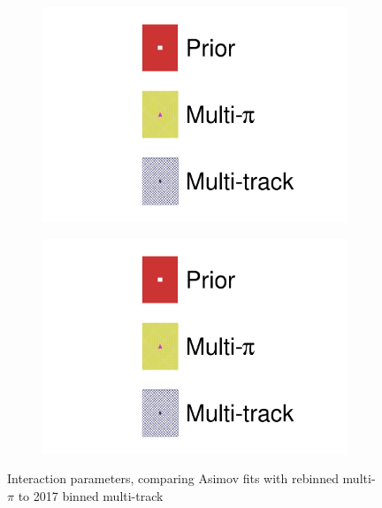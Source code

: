 \begin{figure}[h]
	\begin{subfigure}[t]{0.49\textwidth}
		\includegraphics[width=\textwidth,page=20, trim={0mm 0mm 0mm 9mm}, clip]{figures/mach3/2018/asimov/2018a_FixedCov_RedCov_Mpi_Asimov_merg_2018a_NewDetMatrix_OrderSwitched_Data2to8_merge}
	\end{subfigure}
	\begin{subfigure}[t]{0.49\textwidth}
		\includegraphics[width=\textwidth,page=21, trim={0mm 0mm 0mm 9mm}, clip]{figures/mach3/2018/asimov/2018a_FixedCov_RedCov_Mpi_Asimov_merg_2018a_NewDetMatrix_OrderSwitched_Data2to8_merge}
	\end{subfigure}
	\caption{Interaction parameters, comparing Asimov fits with rebinned multi-$\pi$ to 2017 binned multi-track}
	\label{fig:asimov_fit_2018_mpi_mtrack_xsec}
\end{figure}

